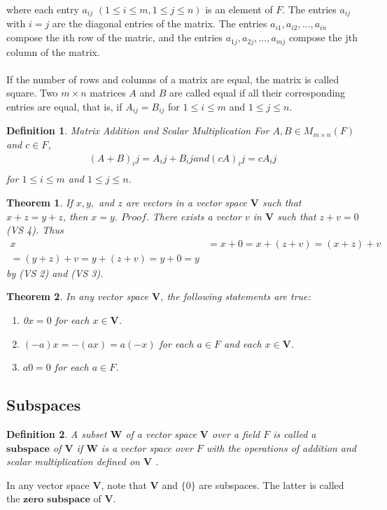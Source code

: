 \documentclass[11pt]{article}
\newtheorem {thm}{Theorem}
\newtheorem{definition}{Definition}
\begin{document}
where each entry $a_{ij}$ $(1\leq i \leq m, 1 \leq j \leq n)$ is an element of $F$. The entries $a_{ij}$ with $i = j$ are the diagonal entries of the matrix. The entries $a_{i1}, a_{i2}, ..., a_{in}$ compose the ith row of the matric, and the entries $a_{1j}, a_{2j}, ..., a_{mj}$ compose the jth column of the matrix.\\\\
If the number of rows and columns of a matrix are equal, the matrix is called square. Two $m \times n$ matrices $A$ and $B$ are called equal if all their corresponding entries are equal, that is, if $A_{ij} = B_{ij}$ for $1 \leq i \leq m$ and $1 \leq j \leq n$.

\begin{definition}{Matrix Addition and Scalar Multiplication}
For $A, B \in M_{m \times n}(F)$ and $c \in F$,\\
\begin{align*}
(A + B)_ij = A_ij + B_ij and (cA)_ij = cA_ij\\
\end{align*}
for $1 \leq i \leq m$ and $1 \leq j \leq n$.
\end{definition}

\begin{thm}
If $ x, y,$ and $z$ are vectors in a vector space $\textbf{V}$ such that $x + z = y + z$, then $x = y$.
\indent $Proof.$ There exists a vector $v$ in $\textbf{V}$ such that $z + v = 0$ (VS 4). Thus
\begin{align*}
x &= x + 0 = x + (z + v) = (x + z) + v\\
= (y + z) + v = y + (z + v) = y + 0 = y
\end{align*}
by (VS 2) and (VS 3).
\end{thm}

\begin{thm}
In any vector space $\textbf{V}$, the following statements are true:
\begin{enumerate}[label=\alph*)]
	\item 0$x = 0$ for each $x \in \textbf{V}$.
	\item $(-a)x = -(ax) = a(-x)$ for each $a \in F$ and each $x \in \textbf{V}$.
	\item $a0 = 0$ for each $a \in F$.
\end{enumerate}
\end{thm}
\subsection{Subspaces}
\begin{definition}
A subset $\textbf{W}$ of a vector space $\textbf{V}$ over a field $F$ is called a $\textbf{subspace}$ of $\textbf{V}$ if 
$\textbf{W}$ is a vector space over $F$ with the operations of addition and scalar multiplication defined on $\textbf{V}$ .
\end{definition}
In any vector space $\textbf{V}$, note that $\textbf{V}$  and $\{0\}$ are subspaces. The latter is called the $\textbf{zero subspace}$ of $\textbf{V}$.\\
\end{document}
